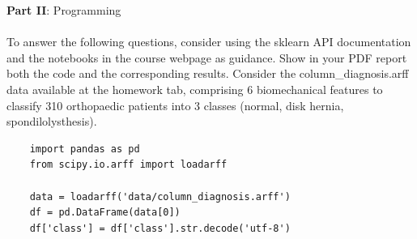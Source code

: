 \documentclass[12pt]{article}
\begin{document}
\vskip 1cm

\large{\textbf{Part II}: Programming}\normalsize

\paragraph{} To answer the following questions, consider using the sklearn API documentation and the notebooks in
the course webpage as guidance. Show in your PDF report both the code and the corresponding results.
Consider the column\_diagnosis.arff data available at the homework tab, comprising 6 biomechanical
features to classify 310 orthopaedic patients into 3 classes (normal, disk hernia, spondilolysthesis). 

\begin{lstlisting}
    import pandas as pd
    from scipy.io.arff import loadarff

    data = loadarff('data/column_diagnosis.arff')
    df = pd.DataFrame(data[0])
    df['class'] = df['class'].str.decode('utf-8')
\end{lstlisting}
\end{document}
